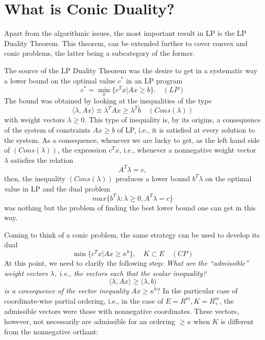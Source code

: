 \documentclass[12pt]{article}
\begin{document}
    \section{What is Conic Duality?}
    \par Apart from the algorithmic issues, the most important result in LP is the LP Duality Theorem. This theorem, can be extended further to cover convex and conic problems, the latter being a subcategory of the former. \par
    The source of the LP Duality Theorem was the desire to get in a systematic way a lower bound on the
    optimal value $c^*$ in an LP program
    $$c^* = \min\limits_{x} \{ c^T x | Ax \geq b \}. \quad (LP)$$
    The bound was obtained by looking at the inequalities of the type 
    $$\langle \lambda, Ax\rangle \equiv \lambda^T Ax \geq \lambda^T b \quad (Cons(\lambda))$$
    with weight vectors $\lambda \geq 0$. This type of inequality is, by its origins, a consequence of the system of constraints $Ax \geq b$ of LP, i.e., it is satisfied at every solution to the system. As a consequence, whenever we are lucky to get, as the left hand side of $(Cons(\lambda))$, the expression $c^T x$, i.e., whenever a nonnegative weight vector $\lambda$ satisfies the relation 
    $$A^T \lambda = c,$$
    then, the inequality $(Cons(\lambda))$ produces a lower bound $b^T \lambda$ on the optimal value in LP 
    and the dual problem 
    $$max \{b^T \lambda : \lambda \geq 0, A^T \lambda = c\}$$
    was nothing but the problem of finding the best lower bound one can get in this way.\par
    Coming to think of a conic problem, the same strategy can be used to develop its dual
    $$\min \{ c^T x | Ax \geq \kappa^b \}, \quad K \subset E \quad (CP)$$
    At this point, we need to clarify the following step:\newline \newline
    \textit{What are the “admissible” weight vectors $\lambda$, i.e., the vectors such that the scalar 
    inequality?}
    $$\langle \lambda, Ax\rangle \geq \langle \lambda, b\rangle$$
    \textit{is a consequence of the vector inequality} $Ax \geq \kappa^b ?$ \newline \newline
    In the particular case of coordinate-wise partial ordering, i.e., in the case of $E = R^m , K = R_+^m $, 
    the admissible vectors were those with nonnegative coordinates. These vectors, however, not necessarily 
    are admissible for an ordering $\geq \kappa$ when $K$ is different from the nonnegative orthant:
    
\end{document}
